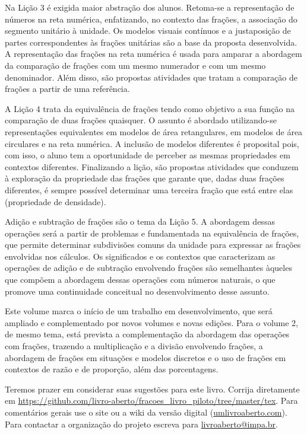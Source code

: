 Na Lição 3 é exigida maior abstração dos alunos. Retoma-se a representação de números na reta numérica, enfatizando, no contexto das frações, a associação do segmento unitário à unidade. Os modelos visuais contínuos e a justaposição de partes correspondentes às frações unitárias são a base da proposta desenvolvida. A representação das frações na reta numérica é usada para amparar a abordagem da comparação de frações com um mesmo numerador e com um mesmo denominador. Além disso, são propostas atividades que tratam a comparação de frações a partir de uma referência.

A Lição 4 trata da equivalência de frações tendo como objetivo a sua função na comparação de duas frações quaisquer. O assunto é abordado utilizando-se representações equivalentes em modelos de área retangulares, em modelos de área circulares e na reta numérica. A inclusão de modelos diferentes é proposital pois, com isso, o aluno tem a oportunidade de perceber as mesmas propriedades em contextos diferentes. Finalizando a lição, são propostas atividades que conduzem à exploração da propriedade das frações que garante que, dadas duas frações diferentes, é sempre possível determinar uma terceira fração que está entre elas (propriedade de densidade).

Adição e subtração de frações são o tema da Lição 5.
A abordagem dessas operações será a partir de problemas e fundamentada na equivalência de frações, que permite determinar subdivisões comuns da unidade para expressar as frações envolvidas nos cálculos.
Os significados e os contextos que caracterizam as operações de adição e de subtração ​envolvendo frações são semelhantes àqueles que compõem a abordagem dessas operações com números naturais, ​o que ​promove​​ uma continuidade conceitual ​no desenvolvimento desse assunto.

Este volume marca o início de um trabalho em desenvolvimento, que será ampliado e complementado por novos volumes e novas edições. Para o volume 2, de mesmo tema, está prevista a complementação da abordagem das operações com frações, trazendo a multiplicação e a divisão envolvendo frações, a abordagem de frações em situações e modelos discretos e o uso de frações em contextos de razão e de proporção, além das porcentagens.


Teremos prazer em considerar suas sugestões para este livro.
Corrija diretamente em \textcolor{blue}{\url{https://github.com/livro-aberto/fracoes_livro_piloto/tree/master/tex}}.\newline
Para comentários gerais use o site ou a wiki da versão digital (\textcolor{blue}{\url{umlivroaberto.com}}).
Para contactar a organização do projeto escreva para \textcolor{blue}{\url{livroaberto@impa.br}}.
